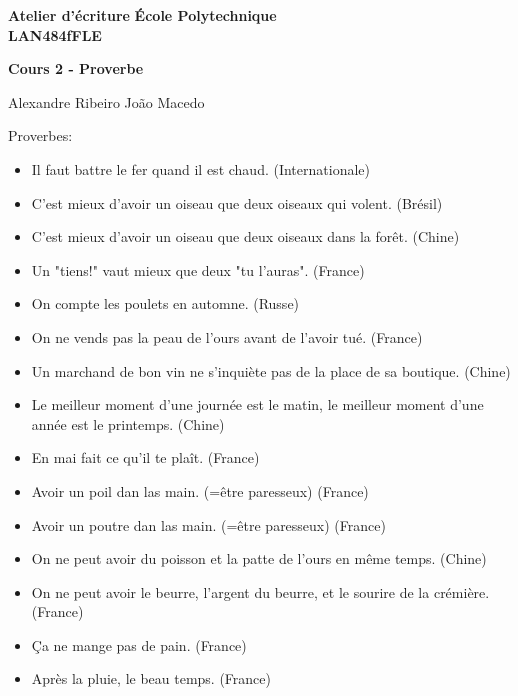 \documentclass[10pt]{article} %
\newcommand{\createHeader}[6]{
	\noindent
	\normalsize\textbf{#2} \hfill \textbf{#1}\\
	\normalsize\textbf{#3} \hfill \textbf{\displaydate{#6}}\vspace{20pt}
	\centerline{\Large \textbf{#5}}\vspace{3pt}
	\centerline{\normalsize #4}\vspace{20pt}}
\begin{document}
	\createHeader{École Polytechnique}{Atelier d'écriture}{LAN484fFLE}{Alexandre Ribeiro João Macedo}{Cours 2 - Proverbe}{date}
	Proverbes:
	\begin{itemize}
		\item Il faut battre le fer quand il est chaud. (Internationale)
		\\
		\item C'est mieux d'avoir un oiseau que deux oiseaux qui volent. (Brésil)
		\item C'est mieux d'avoir un oiseau que deux oiseaux dans la forêt. (Chine)
		\item Un "tiens!" vaut mieux que deux "tu l'auras". (France)
		\\
		\item On compte les poulets en automne. (Russe)
		\item On ne vends pas la peau de l'ours avant de l'avoir tué. (France)
		\\
		\item Un marchand de bon vin ne s'inquiète pas de la place de sa boutique. (Chine)
		\\
		\item Le meilleur moment d'une journée est le matin, le meilleur moment d'une année est le printemps. (Chine)
		\item En mai fait ce qu'il te plaît. (France)
		\\
		\item Avoir un poil dan las main. (=être paresseux) (France)
		\item Avoir un poutre dan las main. (=être paresseux) (France)
		\\
		\item On ne peut avoir du poisson et la patte de l'ours en même temps. (Chine)
		\item On ne peut avoir le beurre, l'argent du beurre, et le sourire de la crémière. (France) 
		\\
		\item Ça ne mange pas de pain. (France)
		\\
		\item Après la pluie, le beau temps. (France)
	\end{itemize}
\end{document}
